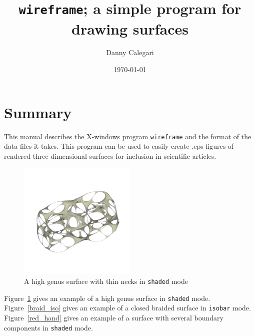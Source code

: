 \documentclass[12pt]{article}
\begin{document}
\title{{\tt wireframe}; a simple program for drawing surfaces}

\author{Danny Calegari}
\date{\today}



\maketitle
\setcounter{tocdepth}{1}
\tableofcontents

\section{Summary}
This manual describes the X-windows program {\tt wireframe} and the format of the data files it takes.
This program can be used to easily create .eps figures of rendered three-dimensional surfaces
for inclusion in scientific articles.

\begin{figure}[ht]
  \caption{A high genus surface with thin necks in {\tt shaded} mode}\label{skeleton}
  \centering
    \includegraphics[width=0.5\textwidth]{skeleton}
\end{figure}

Figure~\ref{skeleton} gives an example of a high genus surface in {\tt shaded} mode.
Figure~\ref{braid_iso} gives an example of a closed braided surface in {\tt isobar} mode. 
Figure~\ref{red_hand} gives an example of a surface with several boundary components in {\tt shaded}
mode.
\end{document}

